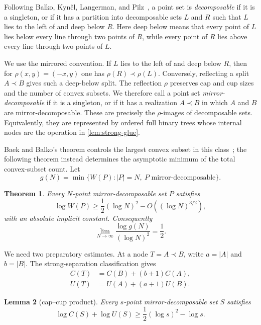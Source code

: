 \documentclass[11pt]{article}
\newtheorem{theorem}{Theorem}[section]
\newtheorem{lemma}[theorem]{Lemma}
\theoremstyle{remark}
\begin{document}
Following Balko, Kyn\v{c}l, Langerman, and Pilz~\cite{BalkoEtAl2017}, a
point set is \emph{decomposable} if it is a singleton, or if it has a
partition into decomposable sets $L$ and $R$ such that $L$ lies to the left
of and deep below $R$.  Here deep below means that every point of $L$ lies
below every line through two points of $R$, while every point of $R$ lies
above every line through two points of $L$.

We use the mirrored convention.  If $L$ lies to the left of and deep below
$R$, then for $\rho(x,y)=(-x,y)$ one has $\rho(R)\prec\rho(L)$.
Conversely, reflecting a split $A\prec B$ gives such a deep-below split.
The reflection $\rho$ preserves cap and cup sizes and the number of convex
subsets.  We therefore call a point set \emph{mirror-decomposable} if it is
a singleton, or if it has a realization $A\prec B$ in which $A$ and $B$ are
mirror-decomposable.  These are precisely the $\rho$-images of decomposable
sets.  Equivalently, they are represented by ordered full binary trees whose
internal nodes are the operation in \cref{lem:strong-glue}.

Baek and Balko's theorem controls the largest convex subset in this
class~\cite[Theorem~7]{BaekBalko2026}; the following theorem instead
determines the asymptotic minimum of the total convex-subset count.
Let
\[
 g(N)=\min\{W(P): |P|=N,\ P\text{ mirror-decomposable}\}.
\]

\begin{theorem}\label{thm:strong-class}
Every $N$-point mirror-decomposable set $P$ satisfies
\begin{equation}
 \log W(P)\ge \frac12(\log N)^2-O((\log N)^{3/2}),
 \label{eq:strong-lower}
\end{equation}
with an absolute implicit constant.  Consequently
\begin{equation}
 \lim_{N\to\infty}\frac{\log g(N)}{(\log N)^2}=\frac12.
 \label{eq:strong-limit}
\end{equation}
\end{theorem}

We need two preparatory estimates.  At a node $T=A\prec B$, write
$a=|A|$ and $b=|B|$.  The strong-separation classification gives
\begin{align}
 C(T)&=C(B)+(b+1)C(A),\label{eq:tree-C}\\
 U(T)&=U(A)+(a+1)U(B).\label{eq:tree-U}
\end{align}

\begin{lemma}[cap--cup product]\label{lem:product-mass}
Every $s$-point mirror-decomposable set $S$ satisfies
\[
 \log C(S)+\log U(S)\ge\frac12(\log s)^2-\log s.
\]
\end{lemma}
\end{document}
